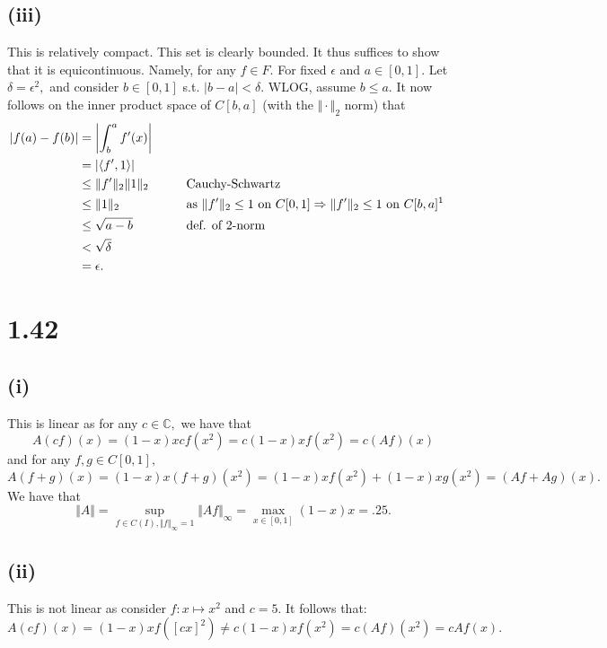 \documentclass[10pt]{article}
\begin{document}
\subsection*{(iii)} This is relatively compact. This set is clearly bounded. It thus suffices to show that it is equicontinuous. Namely, for any $f\in F.$ For fixed $\epsilon$ and $a\in[0,1].$ Let $\delta = \epsilon^2,$ and consider $b \in [0,1]$ s.t. $|b-a|<\delta.$ WLOG, assume $b\le a.$ It now follows on the inner product space of $C[b,a]$ (with the $\Vert \cdot\Vert_2$ norm) that
\begin{alignat*}{2}
    |f(a)-f(b)| &= \left | \int_{b}^{a}f'(x) \right |\\
    &= |\langle f', 1\rangle |\\
    &\le \Vert f'\Vert_2\Vert 1\Vert_2 \qquad&&\text{Cauchy-Schwartz}\\
    &\le \Vert 1\Vert_2 &&\text{as $\Vert f'\Vert_2\le 1$ on $C[0,1]\Rightarrow\Vert f'\Vert_2\le 1$ on $C[b,a]$\footnotemark}\\
    &\le \sqrt{a-b}&&\text{def. of 2-norm}\\
    &< \sqrt{\delta}\\
    &=\epsilon.
\end{alignat*}

\section*{1.42}

\subsection*{(i)} This is linear as for any $c\in\mathbb{C},$ we have that
\[A(cf)(x) = (1-x)xcf(x^2)=c(1-x)xf(x^2)=c(Af)(x)\]
and for any $f,g\in C[0,1],$
\[A(f+g)(x)=(1-x)x(f+g)(x^2)=(1-x)xf(x^2)+(1-x)xg(x^2)=(Af + Ag)(x).\]
We have that
\[\Vert A\Vert = \sup_{f\in C(I), \Vert f\Vert_\infty =1} \Vert Af\Vert_\infty = \max_{x\in[0,1]}(1-x)x = .25.\]

\subsection*{(ii)} This is not linear as consider $f: x\mapsto x^2$ and  $c=5.$ It follows that:
\[A(cf)(x) = (1-x)xf([cx]^2)\neq c(1-x)xf(x^2)=c(Af)(x^2) = cAf(x).\]
\end{document}

